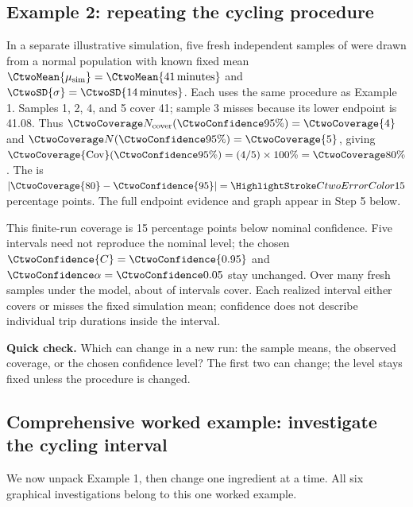 \noindent\begin{minipage}{\linewidth}
\subsection{Example 2: repeating the cycling procedure}
\label{subsec:c2-coverage-example}
In a separate illustrative simulation, five fresh independent samples of
 were drawn from a normal population with known fixed mean
$\CtwoMean{\mu_{\rm sim}}=\CtwoMean{41\,\text{minutes}}$ and
$\CtwoSD{\sigma}=\CtwoSD{14\,\text{minutes}}$.
Each uses the same  procedure as Example 1.
Samples 1, 2, 4, and 5 cover 41; sample 3 misses because its lower endpoint is 41.08.
Thus $\CtwoCoverCount(\CtwoConfidence{95\%})=\CtwoCoverage{4}$ and
$\CtwoTotalCount(\CtwoConfidence{95\%})=\CtwoCoverage{5}$, giving
$\CtwoCoverage{\mathrm{Cov}}(\CtwoConfidence{95\%})=(4/5)\times100\%=\CtwoCoverage{80\%}$.
The  is $|\CtwoCoverage{80}-\CtwoConfidence{95}|=\CtwoError{15}$ percentage points.
The full endpoint evidence and graph appear in Step 5 below.

This finite-run coverage is 15 percentage points below nominal confidence.
Five intervals need not reproduce the nominal level; the chosen
$\CtwoConfidence{C}=\CtwoConfidence{0.95}$ and $\CtwoSignificance{\alpha}=\CtwoSignificance{0.05}$ stay unchanged.
Over many fresh samples under the model, about  of intervals cover.
Each realized interval either covers or misses the fixed simulation mean;
confidence does not describe individual trip durations inside the interval.

\textbf{Quick check.} Which can change in a new run: the sample means, the observed coverage, or the chosen confidence level? The first two can change; the level stays fixed unless the procedure is changed.
\par\vspace{3mm}
\end{minipage}\par

\clearpage

\subsection{Comprehensive worked example: investigate the cycling interval}
\label{subsec:c2-comprehensive}
We now unpack Example 1, then change one ingredient at a time. All six graphical
investigations belong to this one worked example.

